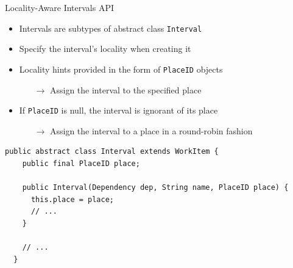 \begin{frame}[fragile]{Locality-Aware Intervals API}
  \begin{itemize}
  \item Intervals are subtypes of abstract class \lstinline!Interval!
  \item Specify the interval's locality when creating it
  \item Locality hints provided in the form of \lstinline!PlaceID!
    objects
    \begin{itemize}
    \item[$\rightarrow$] Assign the interval to the specified place
    \end{itemize}
  \item If \lstinline!PlaceID! is null, the interval is ignorant of
    its place    
    \begin{itemize}
    \item[$\rightarrow$] Assign the interval to a place in a
      round-robin fashion
    \end{itemize}
  \end{itemize}


\begin{lstlisting}[basicstyle=\fontsize{8}{10}\selectfont\ttfamily]
  public abstract class Interval extends WorkItem {	
    public final PlaceID place;

    public Interval(Dependency dep, String name, PlaceID place) {
      this.place = place;  
      // ...
    }
    
    // ...
  }\end{lstlisting}
\end{frame}


